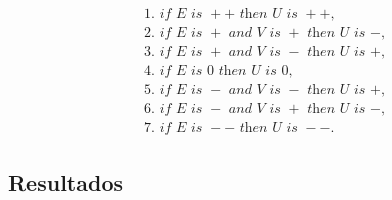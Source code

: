\begin{equation*}
\begin{aligned}
    &\text{1. } \textit{if } E \textit{ is } ++ \textit{ then } U \textit{ is } ++, \\
    &\text{2. } \textit{if } E \textit{ is } + \textit{ and } V \textit{ is } + \textit{ then } U \textit{ is } -, \\
    &\text{3. } \textit{if } E \textit{ is } + \textit{ and } V \textit{ is } - \textit{ then } U \textit{ is } +, \\
    &\text{4. } \textit{if } E \textit{ is } 0 \textit{ then } U \textit{ is } 0, \\
    &\text{5. } \textit{if } E \textit{ is } - \textit{ and } V \textit{ is } - \textit{ then } U \textit{ is } +, \\
    &\text{6. } \textit{if } E \textit{ is } - \textit{ and } V \textit{ is } + \textit{ then } U \textit{ is } -, \\
    &\text{7. } \textit{if } E \textit{ is } -- \textit{ then } U \textit{ is } --.
\end{aligned}
\end{equation*}

\subsection{Resultados}